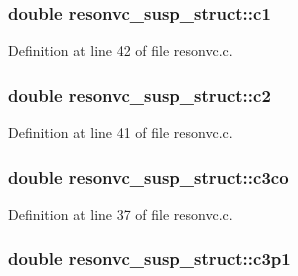 \subsubsection[{\texorpdfstring{c1}{c1}}]{\setlength{\rightskip}{0pt plus 5cm}double resonvc\+\_\+susp\+\_\+struct\+::c1}\hypertarget{structresonvc__susp__struct_a78cd7d579da17b3a51732b4d0a886228}{}\label{structresonvc__susp__struct_a78cd7d579da17b3a51732b4d0a886228}


Definition at line 42 of file resonvc.\+c.

\subsubsection[{\texorpdfstring{c2}{c2}}]{\setlength{\rightskip}{0pt plus 5cm}double resonvc\+\_\+susp\+\_\+struct\+::c2}\hypertarget{structresonvc__susp__struct_a9f2e7e09ef705cbc2584d7ab556ea3cd}{}\label{structresonvc__susp__struct_a9f2e7e09ef705cbc2584d7ab556ea3cd}


Definition at line 41 of file resonvc.\+c.

\subsubsection[{\texorpdfstring{c3co}{c3co}}]{\setlength{\rightskip}{0pt plus 5cm}double resonvc\+\_\+susp\+\_\+struct\+::c3co}\hypertarget{structresonvc__susp__struct_af9653c8ca771c897bd209d2c6004b095}{}\label{structresonvc__susp__struct_af9653c8ca771c897bd209d2c6004b095}


Definition at line 37 of file resonvc.\+c.

\subsubsection[{\texorpdfstring{c3p1}{c3p1}}]{\setlength{\rightskip}{0pt plus 5cm}double resonvc\+\_\+susp\+\_\+struct\+::c3p1}\hypertarget{structresonvc__susp__struct_af4b10e869f8e44b51686513b65382f7e}{}\label{structresonvc__susp__struct_af4b10e869f8e44b51686513b65382f7e}


